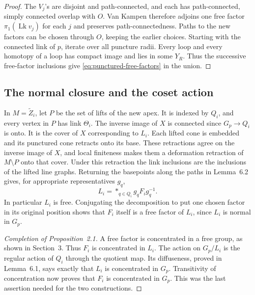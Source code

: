 \documentclass[11pt,a4paper]{article}
\numberwithin{equation}{section}
\begin{document}
\begin{proof}
The $V_j$'s are disjoint and path-connected, and each has path-connected,
simply connected overlap with $O$. Van Kampen therefore adjoins one free
factor $\pi_1(\operatorname{Lk}v_j)$ for each $j$ and preserves
path-connectedness. Paths to the new factors can be chosen through $O$,
keeping the earlier choices. Starting with the connected link of $p$,
iterate over all puncture radii. Every loop and every homotopy of a loop has
compact image and lies in some $Y_R$. Thus the successive free-factor
inclusions give \eqref{eq:punctured-free-factors} in the union.
\end{proof}

\subsection{The normal closure and the coset action}

In $M=\widetilde Z_i$, let $P$ be the set of lifts of the new apex. It is
indexed by $Q_i$, and every vertex in $P$ has link $\Theta_i$. The inverse
image of $X$ is connected since $G_p\to Q_i$ is onto. It is the cover of
$X$ corresponding to $L_i$. Each lifted cone is embedded and its punctured
cone retracts onto its base. These retractions agree on the inverse image of
$X$, and local finiteness makes them a deformation retraction of
$M\setminus P$ onto that cover. Under this retraction the link inclusions
are the inclusions of the lifted line graphs. Returning the basepoints along
the paths in Lemma~6.2 gives, for appropriate representatives $g_q$,
\begin{equation}
 L_i=\mathop{\ast}_{q\in Q_i}g_q F_i g_q^{-1}.
 \label{eq:line-closure}
\end{equation}
In particular $L_i$ is free. Conjugating the decomposition to put one chosen
factor in its original position shows that $F_i$ itself is a free factor of
$L_i$, since $L_i$ is normal in $G_p$.

\begin{proof}[Completion of Proposition~2.1]
A free factor is concentrated in a free group, as shown in Section~3. Thus
$F_i$ is concentrated in $L_i$. The action on $G_p/L_i$ is the regular
action of $Q_i$ through the quotient map. Its diffuseness, proved in
Lemma~6.1, says exactly that $L_i$ is concentrated in $G_p$. Transitivity
of concentration \cite[Theorem~1.3(1)]{r6} now proves that $F_i$ is
concentrated in $G_p$. This was the last assertion needed for the two
constructions.
\end{proof}
\end{document}
